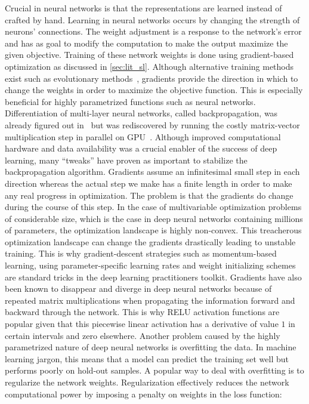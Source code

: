 Crucial in neural networks is that the representations are learned instead of crafted by hand. Learning in neural networks occurs by changing the strength of neurons' connections. The weight adjustment is a response to the network's error and has as goal to modify the computation to make the output maximize the given objective. Training of these network weights is done using gradient-based optimization as discussed in \cref{sec:lit_sl}. Although alternative training methods exist such as evolutionary methods~\autocite{salimans2017evolution}, gradients provide the direction in which to change the weights in order to maximize the objective function. This is especially beneficial for highly parametrized functions such as neural networks. Differentiation of multi-layer neural networks, called backpropagation, was already figured out in~\autocite{rumelhart1986learning} but was rediscovered by running the costly matrix-vector multiplication step in parallel on \gls{GPU}~\autocite{gpu-nn}. Although improved computational hardware and data availability was a crucial enabler of the success of deep learning, many \enquote{tweaks} have proven as important to stabilize the backpropagation algorithm. Gradients assume an infinitesimal small step in each direction whereas the actual step we make has a finite length in order to make any real progress in optimization. The problem is that the gradients do change during the course of this step. In the case of multivariable optimization problems of considerable size, which is the case in deep neural networks containing millions of parameters, the optimization landscape is highly non-convex. This treacherous optimization landscape can change the gradients drastically leading to unstable training. This is why gradient-descent strategies such as momentum-based learning, using parameter-specific learning rates and weight initializing schemes are standard tricks in the deep learning practitioners toolkit. Gradients have also been known to disappear and diverge in deep neural networks because of repeated matrix multiplications when propagating the information forward and backward through the network. This is why \gls{RELU} activation functions are popular given that this piecewise linear activation has a derivative of value $1$ in certain intervals and zero elsewhere. Another problem caused by the highly parametrized nature of deep neural networks is overfitting the data. In machine learning jargon, this means that a model can predict the training set well but performs poorly on hold-out samples. A popular way to deal with overfitting is to regularize the network weights. Regularization effectively reduces the network computational power by imposing a penalty on weights in the loss function:
